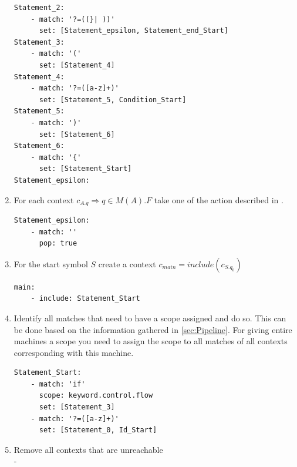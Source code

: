 \begin{enumerate}
\begin{lstlisting}[language=SublimeSyntax]
Statement_2:
 	- match: '?=((}| ))'
	  set: [Statement_epsilon, Statement_end_Start]
Statement_3:
	- match: '('
	  set: [Statement_4]
Statement_4:
 	- match: '?=([a-z]+)'
	  set: [Statement_5, Condition_Start]
Statement_5:
	- match: ')'
	  set: [Statement_6]
Statement_6:
	- match: '{'
	  set: [Statement_Start]
Statement_epsilon:
\end{lstlisting}
\item For each context $c_{A.q} \Rightarrow q \in M(A).F$ take one of the action described in .
\begin{lstlisting}[language=SublimeSyntax]
Statement_epsilon:
	- match: ''
	  pop: true
\end{lstlisting}
\item For the start symbol $S$ create a context $c_{main} = include(c_{S.{q_0}})$
\begin{lstlisting}[language=SublimeSyntax]
main:
	- include: Statement_Start
\end{lstlisting}
\item Identify all matches that need to have a scope assigned and do so. This can be done based on the information gathered in \ref{sec:Pipeline}. For giving entire machines a scope you need to assign the scope to all matches of all contexts corresponding with this machine.
\begin{lstlisting}[language=SublimeSyntax]
Statement_Start:
	- match: 'if'
	  scope: keyword.control.flow
	  set: [Statement_3]
 	- match: '?=([a-z]+)'
	  set: [Statement_0, Id_Start]
\end{lstlisting}
\item Remove all contexts that are unreachable\\
-
\end{enumerate}
		